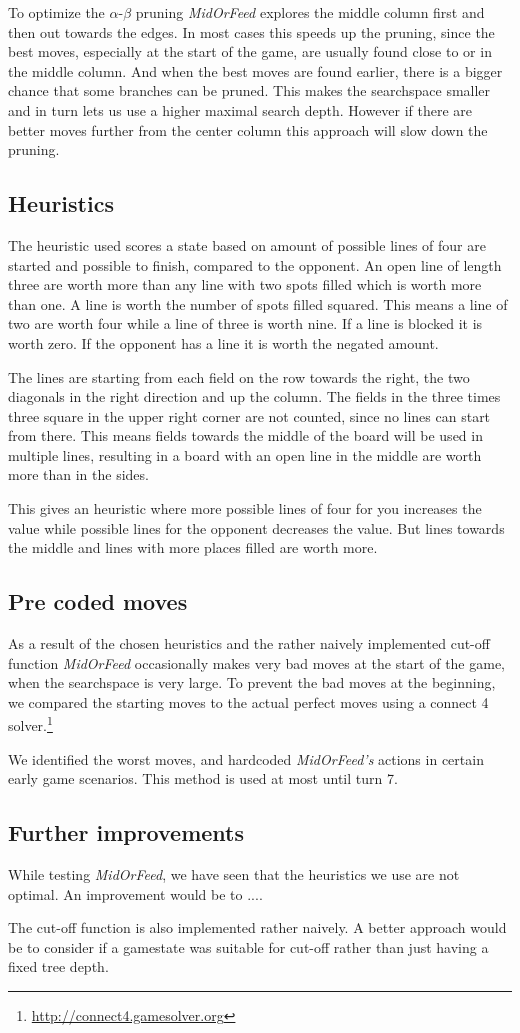To optimize the $\alpha$-$\beta$ pruning \textit{MidOrFeed} explores the middle column first and then out towards the edges. In most cases this speeds up the pruning, since the best moves, especially at the start of the game, are usually found close to or in the middle column. And when the best moves are found earlier, there is a bigger chance that some branches can be pruned. This makes the searchspace smaller and in turn lets us use a higher maximal search depth. However if there are better moves further from the center column this approach will slow down the pruning.

\subsection{Heuristics}
The heuristic used scores a state based on amount of possible lines of four are started and possible to finish, compared to the opponent. An open line of length three are worth more than any line with two spots filled which is worth more than one. A line is worth the number of spots filled squared. This means a line of two are worth four while a line of three is worth nine. If a line is blocked it is worth zero. If the opponent has a line it is worth the negated amount.

The lines are starting from each field on the row towards the right, the two diagonals in the right direction and up the column. The fields in the three times three square in the upper right corner are not counted, since no lines can start from there. This means fields towards the middle of the board will be used in multiple lines, resulting in a board with an open line in the middle are worth more than in the sides.

This gives an heuristic where more possible lines of four for you increases the value while possible lines for the opponent decreases the value. But lines towards the middle and lines with more places filled are worth more.

\subsection{Pre coded moves}
As a result of the chosen heuristics and the rather naively implemented cut-off function \textit{MidOrFeed} occasionally makes very bad moves at the start of the game, when the searchspace is very large. To prevent the bad moves at the beginning, we compared the starting moves to the actual perfect moves using a connect 4 solver.\footnote{\url{http://connect4.gamesolver.org}}

We identified the worst moves, and hardcoded \textit{MidOrFeed's} actions in certain early game scenarios. This method is used at most until turn 7.

\subsection{Further improvements}
While testing \textit{MidOrFeed}, we have seen that the heuristics we use are not optimal. An improvement would be to ....

The cut-off function is also implemented rather naively. A better approach would be to consider if a gamestate was suitable for cut-off rather than just having a fixed tree depth.
